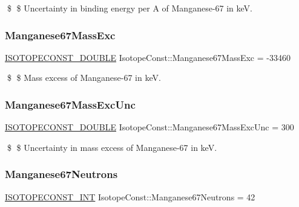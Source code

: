 \$ \$ Uncertainty in binding energy per A of Manganese-\/67 in keV. \mbox{\label{group___isotope_const-_manganese-_mn67_ga4ab1708b8ee16079676ca223592b98f1}} 
\subsubsection{\texorpdfstring{Manganese67\+Mass\+Exc}{Manganese67MassExc}}
{\footnotesize\ttfamily \mbox{\hyperlink{group___isotope_const-_macros_ga8f45a7272ce02c0b4c65c44636ed719a}{I\+S\+O\+T\+O\+P\+E\+C\+O\+N\+S\+T\+\_\+\+D\+O\+U\+B\+LE}} Isotope\+Const\+::\+Manganese67\+Mass\+Exc = -\/33460}

\$ \$ Mass excess of Manganese-\/67 in keV. \mbox{\label{group___isotope_const-_manganese-_mn67_ga4306ee55e923fe86c449ef82bf89e56e}} 
\subsubsection{\texorpdfstring{Manganese67\+Mass\+Exc\+Unc}{Manganese67MassExcUnc}}
{\footnotesize\ttfamily \mbox{\hyperlink{group___isotope_const-_macros_ga8f45a7272ce02c0b4c65c44636ed719a}{I\+S\+O\+T\+O\+P\+E\+C\+O\+N\+S\+T\+\_\+\+D\+O\+U\+B\+LE}} Isotope\+Const\+::\+Manganese67\+Mass\+Exc\+Unc = 300}

\$ \$ Uncertainty in mass excess of Manganese-\/67 in keV. \mbox{\label{group___isotope_const-_manganese-_mn67_ga2e691cb970a09b39563063ea0d2638f2}} 
\subsubsection{\texorpdfstring{Manganese67\+Neutrons}{Manganese67Neutrons}}
{\footnotesize\ttfamily \mbox{\hyperlink{group___isotope_const-_macros_ga5f18360b3e99483a35c32d789e62621c}{I\+S\+O\+T\+O\+P\+E\+C\+O\+N\+S\+T\+\_\+\+I\+NT}} Isotope\+Const\+::\+Manganese67\+Neutrons = 42}

